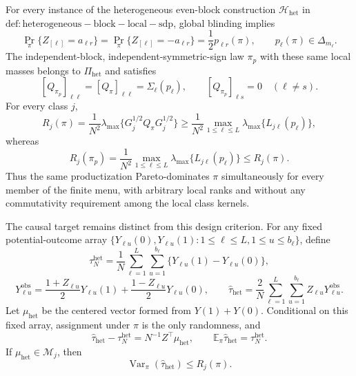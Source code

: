 For every instance of the heterogeneous even-block construction \(\mathcal H_{\mathrm{het}}\) in \(\mathrm{def:heterogeneous-block-local-sdp}\), global blinding implies
\[
\Pr_\pi\{Z_{[\ell]}=a_{\ell r}\}
=\Pr_\pi\{Z_{[\ell]}=-a_{\ell r}\}
=\frac12p_{\ell r}(\pi),
\qquad
p_\ell(\pi)\in\Delta_{m_\ell}.
\]
The independent-block, independent-symmetric-sign law \(\pi_p\) with these same local masses belongs to \(\Pi_{\mathrm{het}}\) and satisfies
\[
[Q_{\pi_p}]_{\ell\ell}=[Q_\pi]_{\ell\ell}=\Sigma_\ell(p_\ell),
\qquad
[Q_{\pi_p}]_{\ell s}=0\quad(\ell\ne s).
\]
For every class \(j\),
\[
R_j(\pi)
=\frac1{N^2}\lambda_{\max}\{G_j^{1/2}Q_\pi G_j^{1/2}\}
\ge\frac1{N^2}\max_{1\le\ell\le L}
\lambda_{\max}\{L_{j\ell}(p_\ell)\},
\]
whereas
\[
R_j(\pi_p)
=\frac1{N^2}\max_{1\le\ell\le L}
\lambda_{\max}\{L_{j\ell}(p_\ell)\}
\le R_j(\pi).
\]
Thus the same productization Pareto-dominates \(\pi\) simultaneously for every member of the finite menu, with arbitrary local ranks and without any commutativity requirement among the local class kernels.

The causal target remains distinct from this design criterion.  For any fixed potential-outcome array \(\{Y_{\ell u}(0),Y_{\ell u}(1):1\le\ell\le L,1\le u\le b_\ell\}\), define
\[
\tau_N^{\mathrm{het}}
=\frac1N\sum_{\ell=1}^L\sum_{u=1}^{b_\ell}
\{Y_{\ell u}(1)-Y_{\ell u}(0)\},
\]
\[
Y_{\ell u}^{\mathrm{obs}}
=\frac{1+Z_{\ell u}}2Y_{\ell u}(1)
+\frac{1-Z_{\ell u}}2Y_{\ell u}(0),
\qquad
\widehat\tau_{\mathrm{het}}
=\frac2N\sum_{\ell=1}^L\sum_{u=1}^{b_\ell}Z_{\ell u}Y_{\ell u}^{\mathrm{obs}}.
\]
Let \(\mu_{\mathrm{het}}\) be the centered vector formed from \(Y(1)+Y(0)\).  Conditional on this fixed array, assignment under \(\pi\) is the only randomness, and
\[
\widehat\tau_{\mathrm{het}}-\tau_N^{\mathrm{het}}
=N^{-1}Z^\top\mu_{\mathrm{het}},
\qquad
\mathbb E_\pi\widehat\tau_{\mathrm{het}}=\tau_N^{\mathrm{het}}.
\]
If \(\mu_{\mathrm{het}}\in\mathcal M_j\), then
\[
\operatorname{Var}_\pi(\widehat\tau_{\mathrm{het}})
\le R_j(\pi).
\]

